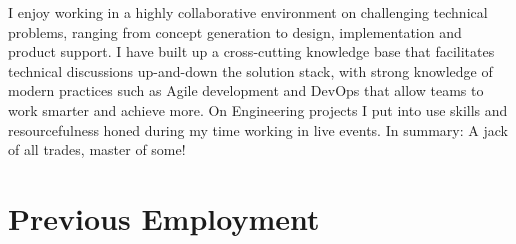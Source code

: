 \documentclass[]{deedy-resume-openfont-wjl}
\begin{document}
%
%


%
%

I enjoy working in a highly collaborative environment on challenging technical problems, ranging from concept generation to design, implementation and product support.
I have built up a cross-cutting knowledge base that facilitates technical discussions up-and-down the solution stack, with strong knowledge of modern practices such as Agile development and DevOps that allow teams to work smarter and achieve more.
On Engineering projects I put into use skills and resourcefulness honed during my time working in live events.
In summary: A jack of all trades, master of some!


%
%
\sectionsep{}\section{Previous Employment}








\end{document}

